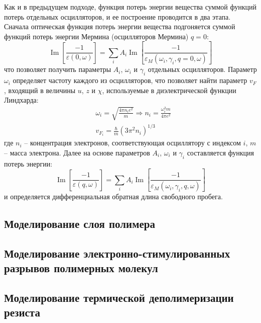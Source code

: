 Как и в предыдущем подходе, функция потерь энергии вещества суммой функций потерь отдельных осцилляторов, и ее построение проводится в два этапа. Сначала оптическая функция потерь энергии вещества подгоняется суммой функций потерь энергии Мермина (осцилляторов Мермина) $q=0$:
\begin{equation}
	\operatorname{Im}\left[\frac{-1}{\varepsilon(0, \omega)}\right]=\sum_i A_i \operatorname{Im}\left[\frac{-1}{\varepsilon_M\left(\omega_i, \gamma_i, q=0, \omega\right)}\right]
\end{equation}
что позволяет получить параметры $A_i$, $\omega_i$ и $\gamma_i$ отдельных осцилляторов. Параметр $\omega_i$ определяет частоту каждого из осцилляторов, что позволяет найти параметр $v_F$, входящий в величины $u$, $z$ и $\chi$, используемые в диэлектрической функции Линдхарда:
\begin{equation}
	\begin{aligned}
		&\omega_i=\sqrt{\frac{4 \pi n_i e^2}{m}} \Rightarrow n_i=\frac{\omega_i^2 m}{4 \pi e^2} \\
		&v_{F_i}=\frac{\hbar}{m}\left(3 \pi^2 n_i\right)^{1 / 3}
	\end{aligned}
\end{equation}
где $n_i$ -- концентрация электронов, соответствующая осциллятору с индексом $i$, $m$ -- масса электрона. Далее на основе параметров $A_i$, $\omega_i$ и $\gamma_i$ составляется функция потерь энергии:
\begin{equation}
	\operatorname{Im}\left[\frac{-1}{\varepsilon(q, \omega)}\right]=\sum_i A_i \operatorname{Im}\left[\frac{-1}{\varepsilon_M\left(\omega_i, \gamma_i, q, \omega\right)}\right]
\end{equation}
и определяется дифференциальная обратная длина свободного пробега.








\subsection{Моделирование слоя полимера}

\subsection{Моделирование электронно-стимулированных разрывов полимерных молекул}

\subsection{Моделирование термической деполимеризации резиста}


